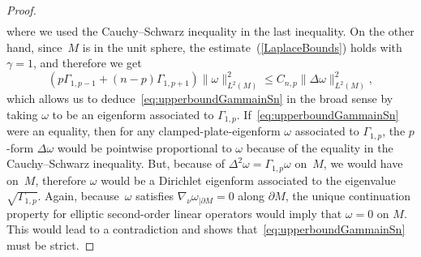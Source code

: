 \documentclass[10pt,a4paper]{amsart}
\numberwithin{equation}{section}
\theoremstyle{definition}
\begin{document}
\begin{proof}
\begin{align*}
\end{align*}
where we used the Cauchy--Schwarz inequality in the last inequality. On the other hand, since~$M$ is in the unit sphere, the estimate~(\ref{LaplaceBounds}) holds with $\gamma=1$, and therefore we get
\[
 (p \Gamma_{1,p-1}+ (n-p) \Gamma_{1,p+1} )\|\omega\|^2_{L^2(M)}\leq C_{n,p}\|\Delta\omega\|^2_{L^2(M)},
\]
which allows us to deduce~\eqref{eq:upperboundGammainSn} in the broad sense by taking $\omega$ to be an eigenform associated to $\Gamma_{1,p}$.
If~\eqref{eq:upperboundGammainSn} were an equality, then for any clamped-plate-eigenform $\omega$ associated to $\Gamma_{1,p}$, the $p$-form $\Delta\omega$ would be pointwise proportional to $\omega$ because of the equality in the Cauchy--Schwarz inequality. But, because of $\Delta^2\omega=\Gamma_{1,p}\omega$ on~$M$, we would have  on~$M$, therefore $\omega$ would be a Dirichlet eigenform associated to the eigenvalue $\sqrt{\Gamma_{1,p}}$.
Again, because~$\omega$ satisfies $\nabla_\nu\omega_{|\partial M}=0$ along $\partial M$, the unique continuation property for elliptic second-order linear operators would imply that $\omega=0$ on $M$.
This would lead to a contradiction and shows that~\eqref{eq:upperboundGammainSn} must be strict.


\end{proof}
\end{document}
